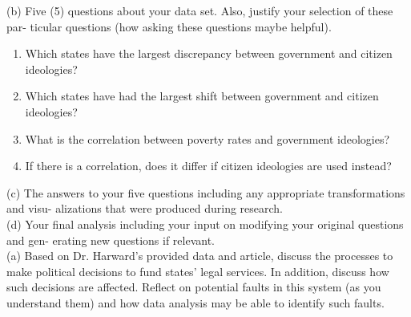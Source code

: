\documentclass[11pt]{article}
\begin{document}
(b) Five (5) questions about your data set. Also, justify your selection of these par-
ticular questions (how asking these questions maybe helpful).\\
\begin{enumerate}
\item Which states have the largest discrepancy between government and citizen ideologies?\\
\item Which states have had the largest shift between government and citizen ideologies?
\item What is the correlation between poverty rates and government ideologies?
\item If there is a correlation, does it differ if citizen ideologies are used instead?
\end{enumerate}
(c) The answers to your five questions including any appropriate transformations and visu-
alizations that were produced during research.\\

(d) Your final analysis including your input on modifying your original questions and gen-
erating new questions if relevant.\\

(a) Based on Dr. Harward’s provided data and article, discuss the processes to make political
decisions to fund states’ legal services. In addition, discuss how such decisions are
affected. Reflect on potential faults in this system (as you understand them) and how
data analysis may be able to identify such faults.





\end{document}
